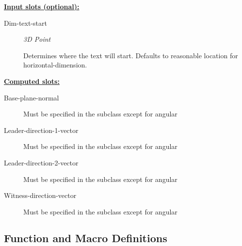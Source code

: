 \documentclass [11pt]{book}
\begin{document}
\begin{itemize}
\textbf{
\underline{Input slots (optional):}}

\begin{description}

\item [Dim-text-start]
\emph{3D Point}

 Determines where the text will start. Defaults to reasonable location for
horizontal-dimension.




\end{description}






\textbf{
\underline{Computed slots:}}

\begin{description}

\item [Base-plane-normal]

Must be specified in the subclass except for angular




\item [Leader-direction-1-vector]

Must be specified in the subclass except for angular




\item [Leader-direction-2-vector]

Must be specified in the subclass except for angular




\item [Witness-direction-vector]

Must be specified in the subclass except for angular




\end{description}







\end{itemize}



\subsection{Function and Macro Definitions}
\end{document}
